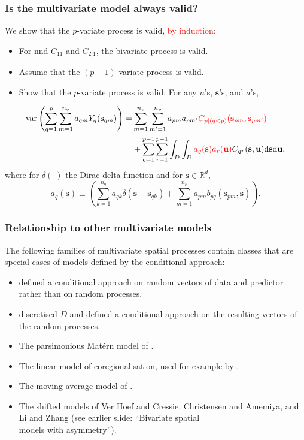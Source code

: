 \documentclass{beamer}
\newcommand{\intd} {\mathrm{d}}
\newcommand{\svec} {\textbf{s}}
\newcommand{\uvec} {\textbf{u}}
\newcommand{\s}{\mathbf{s}}
\newcommand{\var}{\mathrm{var}}
\newcommand{\red}{\textcolor{red}}%
\begin{document}

\begin{frame}
\frametitle{Is the multivariate model always valid?}

We show that the $p$-variate process is valid, \textcolor{red}{by induction}:
\begin{itemize}
  \item For nnd $C_{11}$ and $C_{2|1}$, the bivariate process is valid.
  \item Assume that the $(p-1)$-variate process is valid.
  \item Show that the $p$-variate process is valid: For any $n$'s, $\s$'s, and $a$'s,
\end{itemize}

\vspace{-0.3in}
\begin{align*}
\var\left(\sum_{q=1}^p \sum_{m=1}^{n_q} a_{qm}Y_q(\svec_{qm})\right)=& \sum_{m=1}^{n_p}\sum_{m'=1}^{n_p}a_{pm}a_{pm'}\textcolor{red}{C_{p \mid  (q < p)}(\svec_{pm},\svec_{pm'})} \\
&+ \sum_{q=1}^{p-1}\sum_{r=1}^{p-1}\int_D\int_D\red{a_q(\svec)a_r(\uvec)}C_{qr}(\svec,\uvec)\intd \svec \intd \uvec,
\end{align*}
where for $\delta(\cdot)$ the Dirac delta function and for $\s\in\mathbb{R}^d$,
\begin{equation*}
a_q(\svec) \equiv \left(\sum_{k=1}^{n_q}a_{qk}\delta(\svec - \svec_{qk}) + \sum_{m=1}^{n_p}a_{pm}b_{pq}(\svec_{pm},\svec)\right).
\end{equation*}
\end{frame}


\begin{frame}
\frametitle{Relationship to other multivariate models}
The following families of multivariate spatial processes contain classes that are special cases of models defined by the conditional approach:

\begin{itemize}
\item \cite{RoyleBerliner1999} defined a conditional approach on random vectors of data and predictor rather than on random processes.
\item \cite{CressieWikle2011} discretised $D$ and defined a conditional approach on the resulting vectors of the random processes.
\item The parsimonious Mat{\'e}rn model of \cite{Gneitingetal2010}.\vfil
\item The linear model of coregionalisation, used for example by \cite{Wackernagel1995}.\vfil
\item The moving-average model of \cite{verHoef_1998}.\vfil
\item The shifted models of Ver Hoef and Cressie, Christensen and Amemiya, and Li and Zhang (see earlier slide: ``Bivariate spatial \\models with asymmetry'').
\end{itemize}
\vfill
\end{frame}
\end{document}
